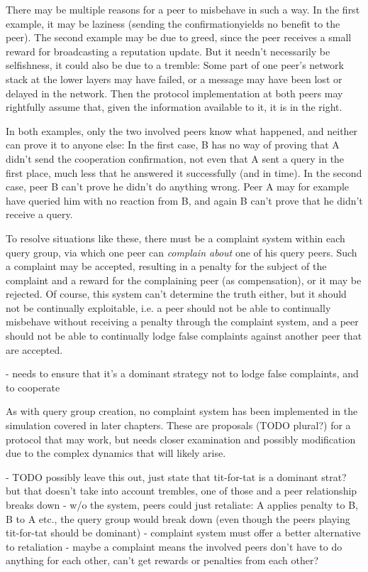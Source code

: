 There may be multiple reasons for a peer to misbehave in such a way. In the
first example, it may be laziness (sending the confirmationyields no benefit to
the peer). The second example may be due to greed, since the peer receives a
small reward for broadcasting a reputation update. But it needn't necessarily be
selfishness, it could also be due to a tremble: Some part of one peer's network
stack at the lower layers may have failed, or a message may have been lost or
delayed in the network. Then the protocol implementation at both peers may
rightfully assume that, given the information available to it, it is in the
right.

In both examples, only the two involved peers know what happened, and neither
can prove it to anyone else: In the first case, B has no way of proving that A
didn't send the cooperation confirmation, not even that A sent a query in the
first place, much less that he answered it successfully (and in time). In the
second case, peer B can't prove he didn't do anything wrong. Peer A may for
example have queried him with no reaction from B, and again B can't prove that
he didn't receive a query.

To resolve situations like these, there must be a complaint system within each
query group, via which one peer can \emph{complain about} one of his query
peers. Such a complaint may be accepted, resulting in a penalty for the subject
of the complaint and a reward for the complaining peer (as compensation), or it
may be rejected. Of course, this system can't determine the truth either, but it
should not be continually exploitable, i.e. a peer should not be able to
continually misbehave without receiving a penalty through the complaint system,
and a peer should not be able to continually lodge false complaints against
another peer that are accepted.

- needs to ensure that it's a dominant strategy not to lodge false complaints,
  and to cooperate

As with query group creation, no complaint system has been implemented in the
simulation covered in later chapters. These are proposals (TODO plural?) for a
protocol that may work, but needs closer examination and possibly modification
due to the complex dynamics that will likely arise.

- TODO possibly leave this out, just state that tit-for-tat is a dominant strat?
  but that doesn't take into account trembles, one of those and a peer
  relationship breaks down
- w/o the system, peers could just retaliate: A applies penalty to B, B to A
  etc., the query group would break down (even though the peers playing
  tit-for-tat should be dominant)
- complaint system must offer a better alternative to retaliation
- maybe a complaint means the involved peers don't have to do anything for each
  other, can't get rewards or penalties from each other?

